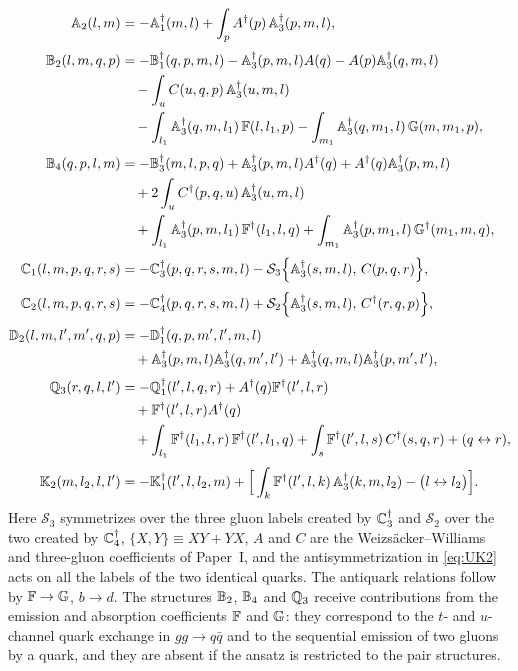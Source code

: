 \begin{align}
\mathbb{A}_{2}(l,m)&=-\mathbb{A}_{1}^{\dagger}(m,l)+\int_{p}A^{\dagger}(p)\,\mathbb{A}_{3}^{\dagger}(p,m,l),
\label{eq:UA2}\\[3pt]
\mathbb{B}_{2}(l,m,q,p)&=-\mathbb{B}_{1}^{\dagger}(q,p,m,l)-\mathbb{A}_{3}^{\dagger}(p,m,l)A(q)-A(p)\mathbb{A}_{3}^{\dagger}(q,m,l)
\nonumber\\
&\quad-\int_{u}C(u,q,p)\,\mathbb{A}_{3}^{\dagger}(u,m,l)
\nonumber\\
&\quad-\int_{l_{1}}\mathbb{A}_{3}^{\dagger}(q,m,l_{1})\,\mathbb{F}(l,l_{1},p)
-\int_{m_{1}}\mathbb{A}_{3}^{\dagger}(q,m_{1},l)\,\mathbb{G}(m,m_{1},p),
\label{eq:UB2}\\[3pt]
\mathbb{B}_{4}(q,p,l,m)&=-\mathbb{B}_{3}^{\dagger}(m,l,p,q)+\mathbb{A}_{3}^{\dagger}(p,m,l)A^{\dagger}(q)+A^{\dagger}(q)\mathbb{A}_{3}^{\dagger}(p,m,l)
\nonumber\\
&\quad+2\int_{u}C^{\dagger}(p,q,u)\,\mathbb{A}_{3}^{\dagger}(u,m,l)
\nonumber\\
&\quad+\int_{l_{1}}\mathbb{A}_{3}^{\dagger}(p,m,l_{1})\,\mathbb{F}^{\dagger}(l_{1},l,q)
+\int_{m_{1}}\mathbb{A}_{3}^{\dagger}(p,m_{1},l)\,\mathbb{G}^{\dagger}(m_{1},m,q),
\label{eq:UB4}\\[3pt]
\mathbb{C}_{1}(l,m,p,q,r,s)&=-\mathbb{C}_{3}^{\dagger}(p,q,r,s,m,l)
-\mathcal S_{3}\Big\{\mathbb{A}_{3}^{\dagger}(s,m,l),\,C(p,q,r)\Big\},
\label{eq:UC1}\\[3pt]
\mathbb{C}_{2}(l,m,p,q,r,s)&=-\mathbb{C}_{4}^{\dagger}(p,q,r,s,m,l)
+\mathcal S_{2}\Big\{\mathbb{A}_{3}^{\dagger}(s,m,l),\,C^{\dagger}(r,q,p)\Big\},
\label{eq:UC2}\\[3pt]
\mathbb{D}_{2}(l,m,l',m',q,p)&=-\mathbb{D}_{1}^{\dagger}(q,p,m',l',m,l)
\nonumber\\&\quad
+\mathbb{A}_{3}^{\dagger}(p,m,l)\mathbb{A}_{3}^{\dagger}(q,m',l')+\mathbb{A}_{3}^{\dagger}(q,m,l)\mathbb{A}_{3}^{\dagger}(p,m',l'),
\label{eq:UD2}\\[3pt]
\mathbb{Q}_{3}(r,q,l,l')&=-\mathbb{Q}_{1}^{\dagger}(l',l,q,r)+A^{\dagger}(q)\mathbb{F}^{\dagger}(l',l,r)
\nonumber\\
&\quad+\mathbb{F}^{\dagger}(l',l,r)A^{\dagger}(q)
\nonumber\\
&\quad+\int_{l_{1}}\mathbb{F}^{\dagger}(l_{1},l,r)\,\mathbb{F}^{\dagger}(l',l_{1},q)
+\int_{s}\mathbb{F}^{\dagger}(l',l,s)\,C^{\dagger}(s,q,r)+(q\leftrightarrow r),
\label{eq:UQ3}\\[3pt]
\mathbb{K}_{2}(m,l_{2},l,l')&=-\mathbb{K}_{1}^{\dagger}(l',l,l_{2},m)
+\Big[\int_{k}\mathbb{F}^{\dagger}(l',l,k)\,\mathbb{A}_{3}^{\dagger}(k,m,l_{2})-\big(l\leftrightarrow l_{2}\big)\Big].
\label{eq:UK2}
\end{align}
Here $\mathcal S_{3}$ symmetrizes over the three gluon labels created by $\mathbb{C}_{3}^{\dagger}$ and
$\mathcal S_{2}$ over the two created by $\mathbb{C}_{4}^{\dagger}$, $\{X,Y\}\equiv XY+YX$, $A$ and $C$ are the
Weizs\"acker--Williams and three-gluon coefficients of Paper~I, and the antisymmetrization in
\eqref{eq:UK2} acts on all the labels of the two identical quarks. The antiquark relations follow
by $\mathbb{F}\to\mathbb{G}$, $b\to d$. The structures $\mathbb{B}_{2}$, $\mathbb{B}_{4}$ and $\mathbb{Q}_{3}$ receive
contributions from the emission and absorption coefficients $\mathbb{F}$ and $\mathbb{G}$: they correspond to
the $t$- and $u$-channel quark exchange in $gg\to q\bar q$ and to the sequential emission of two
gluons by a quark, and they are absent if the ansatz is restricted to the pair structures.

